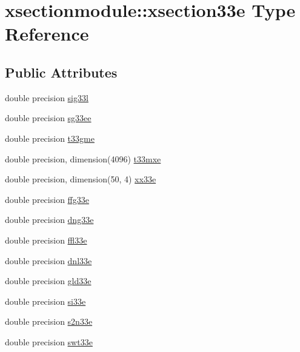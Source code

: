 \hypertarget{structxsectionmodule_1_1xsection33e}{}\section{xsectionmodule\+:\+:xsection33e Type Reference}
\label{structxsectionmodule_1_1xsection33e}
\subsection*{Public Attributes}
\begin{DoxyCompactItemize}
\item 
double precision \hyperlink{structxsectionmodule_1_1xsection33e_a04acedbea7ee63d82fa7e626f7532a71}{sig33l}
\item 
double precision \hyperlink{structxsectionmodule_1_1xsection33e_a5a20be3c3e96dca76d1793f591569cf5}{sg33ee}
\item 
double precision \hyperlink{structxsectionmodule_1_1xsection33e_a25500ed89354be210ba54529e56af90a}{t33gme}
\item 
double precision, dimension(4096) \hyperlink{structxsectionmodule_1_1xsection33e_a092a86c42a2fba625a6805c8c7b22767}{t33mxe}
\item 
double precision, dimension(50, 4) \hyperlink{structxsectionmodule_1_1xsection33e_ac91f08cffbb0e60903a5969392934978}{xx33e}
\item 
double precision \hyperlink{structxsectionmodule_1_1xsection33e_ae2261666d4204fb641405791fd18f82d}{ffg33e}
\item 
double precision \hyperlink{structxsectionmodule_1_1xsection33e_a0603a40daac8788845550d1a88bc5bac}{dng33e}
\item 
double precision \hyperlink{structxsectionmodule_1_1xsection33e_aed911e6feac383d33143aa8caf901074}{ffl33e}
\item 
double precision \hyperlink{structxsectionmodule_1_1xsection33e_a5020ed9d7faa269e9483b6ad94fb9ab3}{dnl33e}
\item 
double precision \hyperlink{structxsectionmodule_1_1xsection33e_a6b7e8af740b386be61068940a017349a}{gld33e}
\item 
double precision \hyperlink{structxsectionmodule_1_1xsection33e_a012e72ebf7d871284048a319df4a8122}{si33e}
\item 
double precision \hyperlink{structxsectionmodule_1_1xsection33e_a2e42b55ef6ff10443a6be9982b39b631}{s2n33e}
\item 
double precision \hyperlink{structxsectionmodule_1_1xsection33e_aaaab811fa015a934656351ba5179a047}{swt33e}

\end{DoxyCompactItemize}
